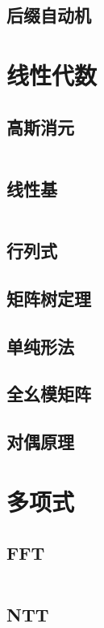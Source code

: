 \documentclass[12pt, a4paper, oneside]{ctexart}
\begin{document}
\begin{multicols}{2}
        \subsection{后缀自动机}
        

        \section{线性代数}
        \subsection{高斯消元}
        \inputminted{cpp}{src/linear/gauss.cpp}
        \subsection{线性基}
        \inputminted{cpp}{src/linear/basis.cpp}
        \subsection{行列式}
        
        \subsection{矩阵树定理}
        
        \subsection{单纯形法}
        
        \subsection{全幺模矩阵}
        
        \subsection{对偶原理}
        

        \section{多项式}
        \subsection{FFT}
        \inputminted{cpp}{src/poly/fft.cpp}
        \subsection{NTT}
        \inputminted{cpp}{src/poly/ntt.cpp}

\end{multicols}
\end{document}
